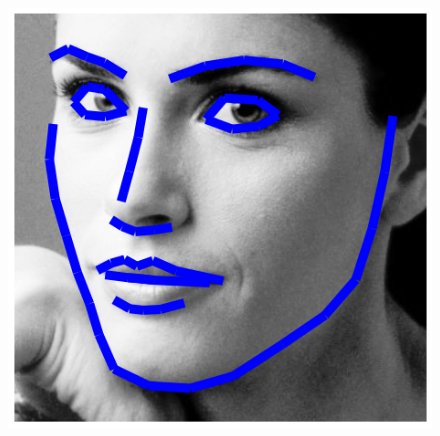 \begin{figure}[ht]
    \hfill
    \includegraphics[width=\textwidth]{resources/Annotation_Correction/Fig_Intro/intro_0_2}
    \\

\end{figure}
